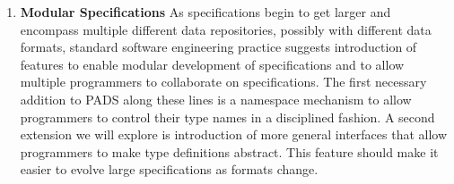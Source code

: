 \begin{enumerate}

\item {\bf Modular Specifications}
As specifications begin to get larger and encompass multiple different data repositories,
possibly with different data formats, standard software engineering practice suggests
introduction of features to enable modular development of specifications and to allow multiple
programmers to collaborate on specifications.  The first necessary addition to PADS along these 
lines is a namespace mechanism to allow programmers to control their type names in a disciplined fashion.
A second extension we will explore is introduction of more general interfaces that allow programmers
to make type definitions abstract.  This feature should make it easier to evolve large specifications as
formats change.

\end{enumerate}
